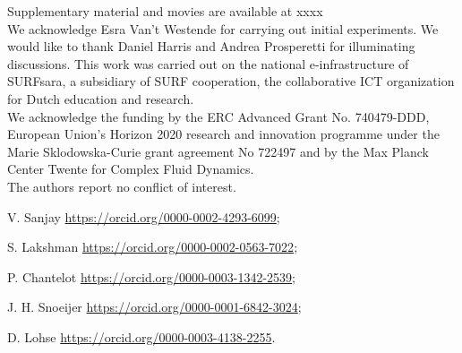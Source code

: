 \documentclass[]{jfm}
\begin{document}
 \label{SM} Supplementary material and movies are available at xxxx \\

  We acknowledge Esra Van't Westende for carrying out initial experiments. We would like to thank Daniel Harris and Andrea Prosperetti for illuminating discussions. This work was carried out on the national e-infrastructure of SURFsara, a subsidiary of SURF cooperation, the collaborative ICT organization for Dutch education and research.\\

 We acknowledge the funding by the ERC Advanced Grant No. 740479-DDD, European Union's Horizon 2020 research and innovation programme under the Marie Sklodowska-Curie grant agreement No 722497 and by the Max Planck Center Twente for Complex Fluid Dynamics.\\

 The authors report no conflict of interest.\\


V. Sanjay \href{https://orcid.org/0000-0002-4293-6099}{https://orcid.org/0000-0002-4293-6099}; 

S. Lakshman \href{https://orcid.org/0000-0002-0563-7022}{https://orcid.org/0000-0002-0563-7022}; 

P. Chantelot \href{https://orcid.org/0000-0003-1342-2539}{https://orcid.org/0000-0003-1342-2539}; 

J. H. Snoeijer \href{https://orcid.org/0000-0001-6842-3024}{https://orcid.org/0000-0001-6842-3024}; 

D. Lohse \href{https://orcid.org/0000-0003-4138-2255}{https://orcid.org/0000-0003-4138-2255}. \\


\appendix
\end{document}
